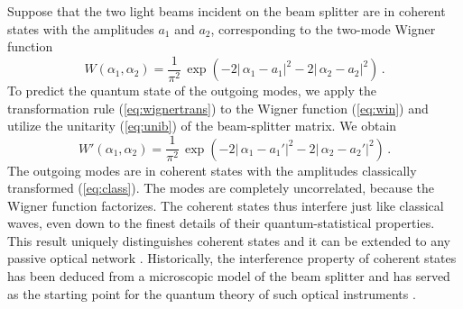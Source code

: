 \documentclass[12pt,amsmath,amssymb]{article}
\numberwithin{equation}{section}
\begin{document}
Suppose that the two light beams incident on the beam splitter
are in coherent states with the amplitudes $a_1$ and $a_2$,
corresponding to the two-mode Wigner function
\begin{equation}
\label{eq:win} W(\alpha_1,\alpha_2) = \frac{1}{\pi^2}\,
\exp\left(-2|\,\alpha_1-a_1|^2-2|\,\alpha_2-a_2|^2\right) \,.
\end{equation}
To predict the quantum state of the outgoing modes, we apply the
transformation rule (\ref{eq:wignertrans}) to the Wigner function
(\ref{eq:win}) and utilize the unitarity (\ref{eq:unib}) of the
beam-splitter matrix. We obtain
\begin{equation}
\label{eq:wout} W'(\alpha_1,\alpha_2) = \frac{1}{\pi^2}\,
\exp\left(-2|\,\alpha_1-a_1'|^2-2|\,\alpha_2-a_2'|^2\right) \,.
\end{equation}
The outgoing modes are in coherent states with the amplitudes
classically transformed (\ref{eq:class}). The modes are
completely uncorrelated, because the Wigner function factorizes.
The coherent states thus interfere just like classical waves,
even down to the finest details of their quantum-statistical
properties. This result uniquely distinguishes coherent states
\cite{Aharonov} and it can be extended to any passive optical
network \cite{Reck,Torma1,Torma3}. Historically, the interference
property of coherent states has been deduced from a microscopic
model of the beam splitter \cite{Brunner} and has served as the
starting point for the quantum theory of such optical instruments
\cite{PaulSplitter}.
\end{document}
